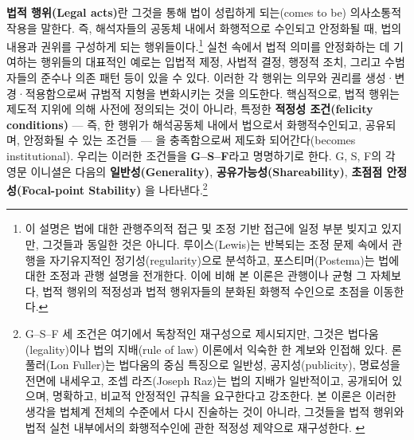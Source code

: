 \documentclass[12pt,a4paper]{article}
\begin{document}
\textbf{법적 행위(Legal acts)}란 그것을 통해 법이 \textsf{성립하게
되는(comes to be)} 의사소통적 작용을 말한다. 즉, 해석자들의 공동체
내에서 화행적으로 수인되고 안정화될 때, 법의 내용과 권위를
\textsf{구성하게 되는} 행위들이다.\footnote{이 설명은 법에 대한 관행주의적
  접근 및 조정 기반 접근에 일정 부분 빚지고 있지만, 그것들과 동일한 것은
  아니다. 루이스(Lewis)는 반복되는 조정 문제 속에서 관행을 자기유지적인
  정기성(regularity)으로 분석하고\autocite{Lewis1969}, 포스티머(Postema)는
  법에 대한 조정과 관행 설명을 전개한다\autocite{Postema1982}. 이에 비해 본
  이론은 관행이나 균형 그 자체보다, 법적 행위의 적정성과 법적 행위자들의
  분화된 화행적 수인으로 초점을 이동한다.} 실천 속에서 법적 의미를
안정화하는 데 기여하는 행위들의 대표적인 예로는 입법적 제정, 사법적
결정, 행정적 조치, 그리고 수범자들의 준수나 의존 패턴 등이 있을 수 있다.
이러한 각 행위는 의무와 권리를 생성·변경·적용함으로써 규범적 지형을
변화시키는 것을 의도한다. 핵심적으로, 법적 행위는 제도적 지위에 의해
\textsf{사전에} 정의되는 것이 아니라, 특정한 \textbf{적정성 조건(felicity
conditions)} --- 즉, 한 행위가 해석공동체 내에서 법으로서
화행적수인되고, 공유되며, 안정화될 수 있는 조건들 --- 을 충족함으로써
\textsf{제도화 되어간다(becomes institutional)}. 우리는 이러한 조건들을
\textbf{G--S--F}라고 명명하기로 한다. G, S, F의 각 영문 이니셜은 다음의
\textbf{일반성(Generality)}, \textbf{공유가능성(Shareability)},
\textbf{초점점 안정성(Focal-point Stability)} 을 나타낸다.\footnote{G--S--F
  세 조건은 여기에서 독창적인 재구성으로 제시되지만, 그것은
  법다움(legality)이나 법의 지배(rule of law) 이론에서 익숙한 한 계보와
  인접해 있다. 론 풀러(Lon Fuller)는 법다움의 중심 특징으로 일반성,
  공지성(publicity), 명료성을 전면에 내세우고, 조셉 라즈(Joseph Raz)는
  법의 지배가 일반적이고, 공개되어 있으며, 명확하고, 비교적 안정적인
  규칙을 요구한다고 강조한다. 본 이론은 이러한 생각을 법체계 전체의
  수준에서 다시 진술하는 것이 아니라, 그것들을 법적 행위와 법적 실천
  내부에서의 화행적수인에 관한 적정성 제약으로 재구성한다.
  \autocite{Fuller1969,Raz1979RuleOfLaw}}
\end{document}
